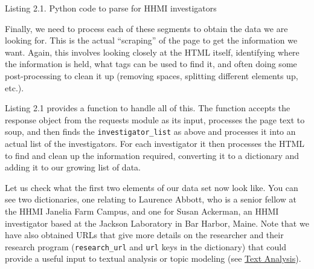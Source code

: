 \documentclass[]{krantz}
\begin{document}
Listing 2.1. Python code to parse for HHMI investigators

Finally, we need to process each of these segments to obtain the data we
are looking for. This is the actual ``scraping'' of the page to get the
information we want. Again, this involves looking closely at the HTML
itself, identifying where the information is held, what tags can be used
to find it, and often doing some post-processing to clean it up
(removing spaces, splitting different elements up, etc.).

Listing 2.1 provides a function to handle all of this. The function
accepts the response object from the requests module as its input,
processes the page text to soup, and then finds the
\texttt{investigator\_list} as above and processes it into an actual
list of the investigators. For each investigator it then processes the
HTML to find and clean up the information required, converting it to a
dictionary and adding it to our growing list of data.

Let us check what the first two elements of our data set now look like.
You can see two dictionaries, one relating to Laurence Abbott, who is a
senior fellow at the HHMI Janelia Farm Campus, and one for Susan
Ackerman, an HHMI investigator based at the Jackson Laboratory in Bar
Harbor, Maine. Note that we have also obtained URLs that give more
details on the researcher and their research program
(\texttt{research\_url} and \texttt{url} keys in the dictionary) that
could provide a useful input to textual analysis or topic modeling (see
\protect\hyperlink{chap:text}{Text Analysis}).
\end{document}
